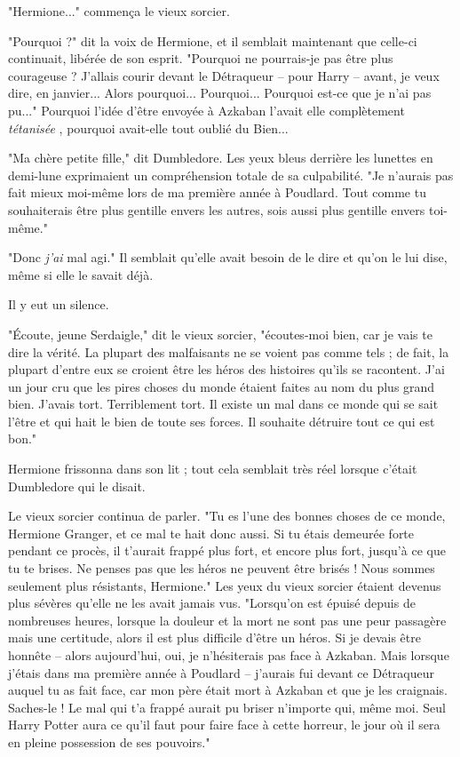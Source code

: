 "Hermione..." commença le vieux sorcier.

"Pourquoi ?" dit la voix de Hermione, et il semblait maintenant que celle-ci continuait, libérée de son esprit. "Pourquoi ne pourrais-je pas être plus courageuse ? J'allais courir devant le Détraqueur – pour Harry – avant, je veux dire, en janvier... Alors pourquoi... Pourquoi... Pourquoi est-ce que je n'ai pas pu..." Pourquoi l'idée d'être envoyée à Azkaban l'avait elle complètement \emph{tétanisée} , pourquoi avait-elle tout oublié du Bien...

"Ma chère petite fille," dit Dumbledore. Les yeux bleus derrière les lunettes en demi-lune exprimaient un compréhension totale de sa culpabilité. "Je n'aurais pas fait mieux moi-même lors de ma première année à Poudlard. Tout comme tu souhaiterais être plus gentille envers les autres, sois aussi plus gentille envers toi-même."

"Donc \emph{j'ai}  mal agi." Il semblait qu'elle avait besoin de le dire et qu'on le lui dise, même si elle le savait déjà.

Il y eut un silence.

"Écoute, jeune Serdaigle," dit le vieux sorcier, "écoutes-moi bien, car je vais te dire la vérité. La plupart des malfaisants ne se voient pas comme tels ; de fait, la plupart d'entre eux se croient être les héros des histoires qu'ils se racontent. J'ai un jour cru que les pires choses du monde étaient faites au nom du plus grand bien. J'avais tort. Terriblement tort. Il existe un mal dans ce monde qui se sait l'être et qui hait le bien de toute ses forces. Il souhaite détruire tout ce qui est bon."

Hermione frissonna dans son lit ; tout cela semblait très réel lorsque c'était Dumbledore qui le disait.

Le vieux sorcier continua de parler. "Tu es l'une des bonnes choses de ce monde, Hermione Granger, et ce mal te hait donc aussi. Si tu étais demeurée forte pendant ce procès, il t'aurait frappé plus fort, et encore plus fort, jusqu'à ce que tu te brises. Ne penses pas que les héros ne peuvent être brisés ! Nous sommes seulement plus résistants, Hermione." Les yeux du vieux sorcier étaient devenus plus sévères qu'elle ne les avait jamais vus. "Lorsqu'on est épuisé depuis de nombreuses heures, lorsque la douleur et la mort ne sont pas une peur passagère mais une certitude, alors il est plus difficile d'être un héros. Si je devais être honnête – alors aujourd'hui, oui, je n'hésiterais pas face à Azkaban. Mais lorsque j'étais dans ma première année à Poudlard – j'aurais fui devant ce Détraqueur auquel tu as fait face, car mon père était mort à Azkaban et que je les craignais. Saches-le ! Le mal qui t'a frappé aurait pu briser n'importe qui, même moi. Seul Harry Potter aura ce qu'il faut pour faire face à cette horreur, le jour où il sera en pleine possession de ses pouvoirs."

